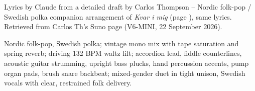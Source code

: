 
\label{sec:min-enda-rost}
\begin{notes}
Lyrics by Claude from a detailed draft by Carlos Thompson -- Nordic folk-pop / Swedish polka companion arrangement of \emph{Kvar i mig} (page \pageref{sec:kvar-i-mig}), same lyrics. Retrieved from Carlos Th's Suno page (V6-MINI, 22 September 2026).
\end{notes}
\begin{style}
Nordic folk-pop, Swedish polka; vintage mono mix with tape saturation and spring reverb; driving 132 BPM waltz lilt; accordion lead, fiddle counterlines, acoustic guitar strumming, upright bass plucks, hand percussion accents, pump organ pads, brush snare backbeat; mixed-gender duet in tight unison, Swedish vocals with clear, restrained folk delivery.
\end{style}
